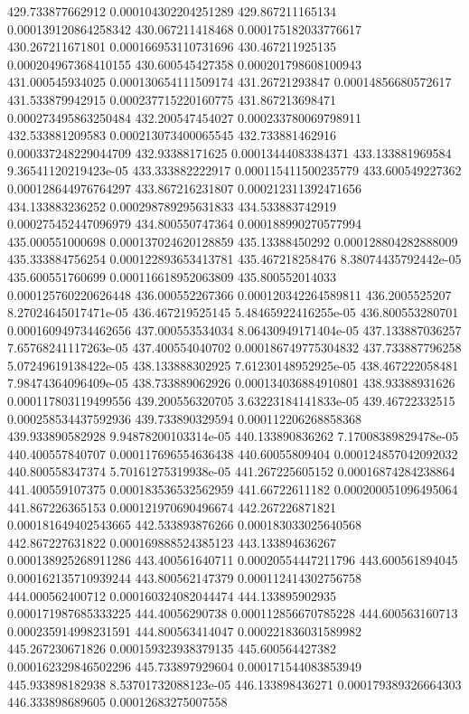 {429.733877662912 0.000104302204251289
429.867211165134 0.000139120864258342
430.067211418468 0.000175182033776617
430.267211671801 0.000166953110731696
430.467211925135 0.000204967368410155
430.600545427358 0.000201798608100943
431.000545934025 0.000130654111509174
431.26721293847 0.00014856680572617
431.533879942915 0.000237715220160775
431.867213698471 0.000273495863250484
432.200547454027 0.000233780069798911
432.533881209583 0.000213073400065545
432.733881462916 0.000337248229044709
432.93388171625 0.00013444083384371
433.133881969584 9.36541120219423e-05
433.333882222917 0.000115411500235779
433.600549227362 0.000128644976764297
433.867216231807 0.000212311392471656
434.133883236252 0.000298789295631833
434.533883742919 0.000275452447096979
434.800550747364 0.000188990270577994
435.000551000698 0.000137024620128859
435.13388450292 0.000128804282888009
435.333884756254 0.000122893653413781
435.467218258476 8.38074435792442e-05
435.600551760699 0.000116618952063809
435.800552014033 0.000125760220626448
436.000552267366 0.000120342264589811
436.2005525207 8.27024645017471e-05
436.467219525145 5.48465922416255e-05
436.800553280701 0.000160949734462656
437.000553534034 8.06430949171404e-05
437.133887036257 7.65768241117263e-05
437.400554040702 0.000186749775304832
437.733887796258 5.07249619138422e-05
438.133888302925 7.61230148952925e-05
438.467222058481 7.98474364096409e-05
438.733889062926 0.000134036884910801
438.93388931626 0.000117803119499556
439.200556320705 3.63223184141833e-05
439.46722332515 0.000258534437592936
439.733890329594 0.000112206268858368
439.933890582928 9.94878200103314e-05
440.133890836262 7.17008389829478e-05
440.400557840707 0.000117696554636438
440.60055809404 0.000124857042092032
440.800558347374 5.70161275319938e-05
441.267225605152 0.00016874284238864
441.400559107375 0.000183536532562959
441.66722611182 0.000200051096495064
441.867226365153 0.000121970690496674
442.267226871821 0.000181649402543665
442.533893876266 0.000183033025640568
442.867227631822 0.000169888524385123
443.133894636267 0.000138925268911286
443.400561640711 0.00020554447211796
443.600561894045 0.000162135710939244
443.800562147379 0.000112414302756758
444.000562400712 0.000160324082044474
444.133895902935 0.000171987685333225
444.40056290738 0.000112856670785228
444.600563160713 0.000235914998231591
444.800563414047 0.000221836031589982
445.267230671826 0.000159323938379135
445.600564427382 0.000162329846502296
445.733897929604 0.000171544083853949
445.933898182938 8.53701732088123e-05
446.133898436271 0.000179389326664303
446.333898689605 0.00012683275007558
}
